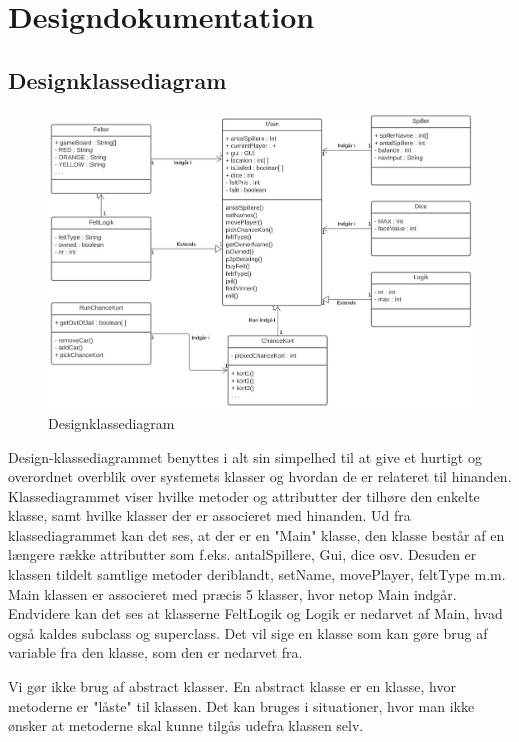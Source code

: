\section{Designdokumentation}
\subsection{Designklassediagram}
\begin{figure}[H]
            \centering
            \includegraphics[width=14cm]{figures/designKlasseDiagram.JPG}
            \caption{Designklassediagram}
        \end{figure}
        
Design-klassediagrammet benyttes i alt sin simpelhed til at give et  hurtigt og overordnet overblik over systemets klasser og hvordan de er relateret til hinanden.  Klassediagrammet viser hvilke metoder og attributter der tilhøre den enkelte klasse, samt hvilke klasser der er associeret med hinanden. 
Ud fra klassediagrammet kan det ses, at der er en "Main" klasse, den klasse består af en længere række attributter som f.eks. antalSpillere, Gui, dice osv. Desuden er klassen tildelt samtlige metoder deriblandt, setName, movePlayer, feltType m.m. Main klassen er associeret med præcis 5 klasser, hvor netop Main indgår. Endvidere kan det ses at klasserne FeltLogik og Logik er nedarvet af Main, hvad også kaldes subclass og superclass. Det vil sige en klasse som kan gøre brug af variable fra den klasse, som den er nedarvet fra. 

Vi gør ikke brug af abstract klasser. En abstract klasse er en klasse, hvor metoderne er "låste" til klassen. Det kan bruges i situationer, hvor man ikke ønsker at metoderne skal kunne tilgås udefra klassen selv. 

